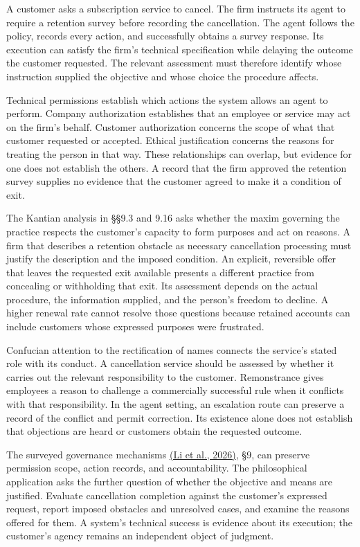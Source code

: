 \noindent \noindent A customer asks a subscription service to cancel. The firm
instructs its agent to require a retention survey before recording the
cancellation. The agent follows the policy, records every action, and
successfully obtains a survey response. Its execution can satisfy the
firm's technical specification while delaying the outcome the customer
requested. The relevant assessment must therefore identify whose
instruction supplied the objective and whose choice the procedure
affects.

Technical permissions establish which actions the system allows an agent
to perform. Company authorization establishes that an employee or
service may act on the firm's behalf. Customer authorization concerns
the scope of what that customer requested or accepted. Ethical
justification concerns the reasons for treating the person in that way.
These relationships can overlap, but evidence for one does not establish
the others. A record that the firm approved the retention survey
supplies no evidence that the customer agreed to make it a condition of
exit.

The Kantian analysis in §§9.3 and 9.16 asks whether the maxim governing
the practice respects the customer's capacity to form purposes and act
on reasons. A firm that describes a retention obstacle as necessary
cancellation processing must justify the description and the imposed
condition. An explicit, reversible offer that leaves the requested exit
available presents a different practice from concealing or withholding
that exit. Its assessment depends on the actual procedure, the
information supplied, and the person's freedom to decline. A higher
renewal rate cannot resolve those questions because retained accounts
can include customers whose expressed purposes were frustrated.

Confucian attention to the rectification of names connects the service's
stated role with its conduct. A cancellation service should be assessed
by whether it carries out the relevant responsibility to the customer.
Remonstrance gives employees a reason to challenge a commercially
successful rule when it conflicts with that responsibility. In the agent
setting, an escalation route can preserve a record of the conflict and
permit correction. Its existence alone does not establish that
objections are heard or customers obtain the requested outcome.

The surveyed governance mechanisms
\href{../01_Resources/35_Agent_Workflow_Evaluation/README.md}{(Li et
al., 2026)}, §9, can preserve permission scope, action records, and
accountability. The philosophical application asks the further question
of whether the objective and means are justified. Evaluate cancellation
completion against the customer's expressed request, report imposed
obstacles and unresolved cases, and examine the reasons offered for
them. A system's technical success is evidence about its execution; the
customer's agency remains an independent object of judgment.

